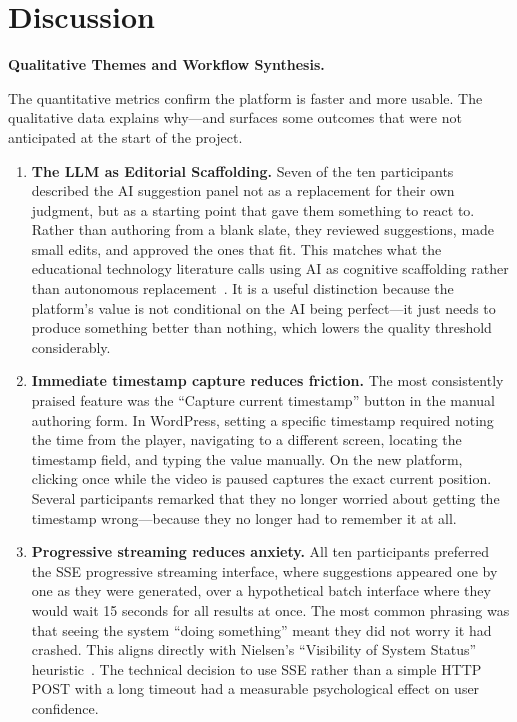 \section{Discussion}

\textbf{Qualitative Themes and Workflow Synthesis.}

The quantitative metrics confirm the platform is faster and more usable. The qualitative data explains why---and surfaces some outcomes that were not anticipated at the start of the project.

\begin{enumerate}
    \item \textbf{The LLM as Editorial Scaffolding.} Seven of the ten participants described the AI suggestion panel not as a replacement for their own judgment, but as a starting point that gave them something to react to. Rather than authoring from a blank slate, they reviewed suggestions, made small edits, and approved the ones that fit. This matches what the educational technology literature calls using AI as cognitive scaffolding rather than autonomous replacement~\cite{hwang2020}. It is a useful distinction because the platform's value is not conditional on the AI being perfect---it just needs to produce something better than nothing, which lowers the quality threshold considerably.

    \item \textbf{Immediate timestamp capture reduces friction.} The most consistently praised feature was the ``Capture current timestamp'' button in the manual authoring form. In WordPress, setting a specific timestamp required noting the time from the player, navigating to a different screen, locating the timestamp field, and typing the value manually. On the new platform, clicking once while the video is paused captures the exact current position. Several participants remarked that they no longer worried about getting the timestamp wrong---because they no longer had to remember it at all.

    \item \textbf{Progressive streaming reduces anxiety.} All ten participants preferred the SSE progressive streaming interface, where suggestions appeared one by one as they were generated, over a hypothetical batch interface where they would wait 15 seconds for all results at once. The most common phrasing was that seeing the system ``doing something'' meant they did not worry it had crashed. This aligns directly with Nielsen's ``Visibility of System Status'' heuristic~\cite{nielsen1994}. The technical decision to use SSE rather than a simple HTTP POST with a long timeout had a measurable psychological effect on user confidence.


\end{enumerate}
